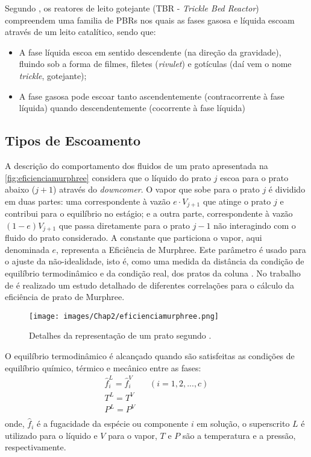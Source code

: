 Segundo , os reatores de leito gotejante (TBR -
\emph{Trickle Bed Reactor}) compreendem uma familia de PBRs nos quais as fases
gasosa e líquida escoam através de um leito catalítico, sendo que: 
\begin{itemize}
\item A fase líquida escoa em sentido descendente (na direção da gravidade),
fluindo sob a forma de filmes, filetes (\emph{rivulet}) e gotículas (daí vem o
nome \emph{trickle}, gotejante);
\item A fase gasosa pode escoar tanto ascendentemente (contracorrente à
fase líquida) quando descendentemente (cocorrente à fase líquida)
\end{itemize}

\subsection {Tipos de Escoamento} \label{sec:tiposdeescoamento}

A descrição do comportamento dos fluidos de um prato apresentada na \autoref{fig:eficienciamurphree}
considera que o líquido do prato
$j$ escoa para o prato abaixo ($j+1$) através do \textit{downcomer}. O vapor que sobe para o prato $j$ é
dividido em duas partes: uma correspondente à vazão $e \cdot V_{j+1}$ que atinge o prato
$j$ e contribui para o equilíbrio no estágio; e a outra parte, correspondente à vazão $(1-e)V_{j+1}$ que passa
diretamente para o prato $j-1$ não interagindo com o fluido do
prato considerado. A constante que particiona o vapor, aqui denominada $e$, representa a Eficiência de Murphree. Este
parâmetro é usado para o ajuste da não-idealidade, isto é, como uma medida da distância da condição de equilíbrio
termodinâmico e da condição real, dos pratos da coluna \cite{Elgue:2004}.
No trabalho de
 é realizado um estudo detalhado de diferentes correlações para o cálculo da eficiência
de prato de Murphree.

 \begin{figure}[htb]
 \centering \texttt{[image: images/Chap2/eficienciamurphree.png]}
 \caption{Detalhes da representação de um prato segundo .}
 \label{fig:eficienciamurphree}
 \end{figure}

O equilíbrio termodinâmico é alcançado quando são satisfeitas as condições de equilíbrio químico, térmico e
mecânico entre as fases:
\begin{equation}
\begin{array}{c}
\hat{f}^L_i = \hat{f}^V_i \qquad (i = 1,2,...,c) \\
T^L = T^V \\
P^L = P^V \\
\end{array}
\end{equation}
onde, $\hat{f}_i$ é a fugacidade da espécie ou componente $i$ em solução, o superscrito
$L$ é utilizado para o líquido e $V$ para o vapor, $T$ e $P$ são a temperatura
e a pressão, respectivamente.

